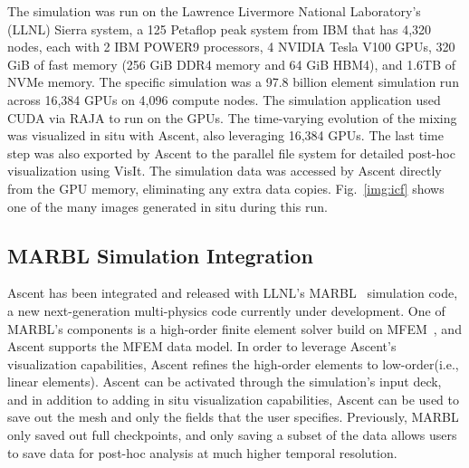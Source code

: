 The simulation was run on the Lawrence Livermore National Laboratory's (LLNL)
Sierra system, a 125 Petaflop peak system from IBM that has 4,320 nodes,
each with 2 IBM POWER9 processors, 4 NVIDIA Tesla V100 GPUs, 320 GiB of
fast memory (256 GiB DDR4 memory and 64 GiB HBM4), and 1.6TB of NVMe
memory. The specific simulation was a 97.8 billion element simulation
run across 16,384 GPUs on 4,096 compute nodes. The simulation application
used CUDA via RAJA to run on the GPUs. The time-varying evolution of the
mixing was visualized in situ with Ascent, also leveraging 16,384 GPUs.
The last time step was also exported by Ascent to the parallel file
system for detailed post-hoc visualization using VisIt\cite{VisIt}. The simulation
data was accessed by Ascent directly from the GPU memory, eliminating any
extra data copies.
Fig.~\ref{img:icf} shows one of the many images generated in situ during
this run.

\subsection{MARBL Simulation Integration}
Ascent has been integrated and released with LLNL's MARBL~\cite{marbl} simulation code,
a new next-generation multi-physics code currently under development.
%
One of MARBL's components is a high-order finite element solver build on
MFEM~\cite{mfem}, and Ascent supports the MFEM data model.
%
In order to leverage Ascent's visualization capabilities, Ascent refines
the high-order elements to low-order(i.e., linear elements).
%
Ascent can be activated through the simulation's input deck, and in addition
to adding in situ visualization capabilities, Ascent can be used to save out
the mesh and only the fields that the user specifies.
%
Previously, MARBL only saved out full checkpoints, and only saving a subset of the
data allows users to save data for post-hoc analysis at much higher temporal resolution.

